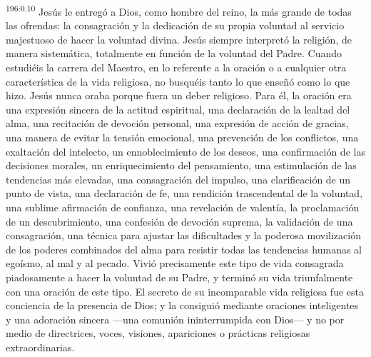 \par 
\textsuperscript{196:0.10} Jesús le entregó a Dios, como hombre del reino, la más grande de todas las ofrendas: la consagración y la dedicación de su propia voluntad al servicio majestuoso de hacer la voluntad divina. Jesús siempre interpretó la religión, de manera sistemática, totalmente en función de la voluntad del Padre. Cuando estudiéis la carrera del Maestro, en lo referente a la oración o a cualquier otra característica de la vida religiosa, no busquéis tanto lo que enseñó como lo que hizo. Jesús nunca oraba porque fuera un deber religioso. Para él, la oración era una expresión sincera de la actitud espiritual, una declaración de la lealtad del alma, una recitación de devoción personal, una expresión de acción de gracias, una manera de evitar la tensión emocional, una prevención de los conflictos, una exaltación del intelecto, un ennoblecimiento de los deseos, una confirmación de las decisiones morales, un enriquecimiento del pensamiento, una estimulación de las tendencias más elevadas, una consagración del impulso, una clarificación de un punto de vista, una declaración de fe, una rendición trascendental de la voluntad, una sublime afirmación de confianza, una revelación de valentía, la proclamación de un descubrimiento, una confesión de devoción suprema, la validación de una consagración, una técnica para ajustar las dificultades y la poderosa movilización de los poderes combinados del alma para resistir todas las tendencias humanas al egoísmo, al mal y al pecado. Vivió precisamente este tipo de vida consagrada piadosamente a hacer la voluntad de su Padre, y terminó su vida triunfalmente con una oración de este tipo. El secreto de su incomparable vida religiosa fue esta conciencia de la presencia de Dios; y la consiguió mediante oraciones inteligentes y una adoración sincera ---una comunión ininterrumpida con Dios--- y no por medio de directrices, voces, visiones, apariciones o prácticas religiosas extraordinarias.

